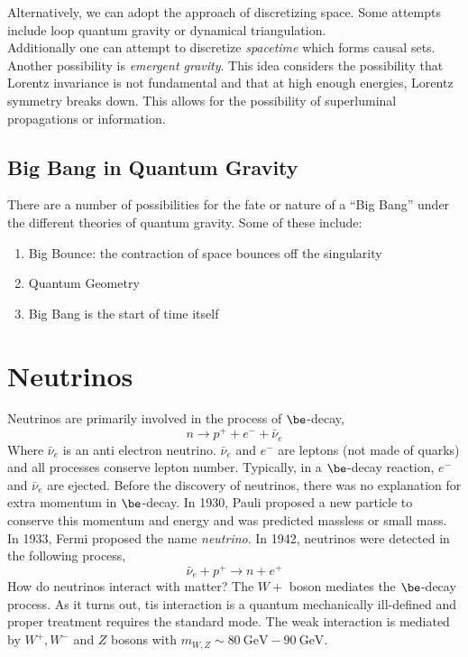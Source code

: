 \documentclass{article}
\begin{document}
Alternatively, we can adopt the approach of discretizing space. Some attempts include loop quantum gravity or dynamical triangulation. \\

Additionally one can attempt to discretize \textit{spacetime} which forms causal sets. \\

Another possibility is \textit{emergent gravity}. This idea considers the possibility that Lorentz invariance is not fundamental and that at high enough energies, Lorentz symmetry breaks down. This allows for the possibility of superluminal propagations or information.

\subsection{Big Bang in Quantum Gravity}

There are a number of possibilities for the fate or nature of a ``Big Bang'' under the different theories of quantum gravity. Some of these include:
\begin{enumerate}
    \item Big Bounce: the contraction of space bounces off the singularity
    \item Quantum Geometry
    \item Big Bang is the start of time itself
\end{enumerate}

\section{Neutrinos}

Neutrinos are primarily involved in the process of $\be$-decay,
\[ n \to p^+ + e^- + \bar \nu_e \]
Where $\bar \nu_e$ is an anti electron neutrino. $\bar \nu_e$ and $e^{-}$ are leptons (not made of quarks) and all processes conserve lepton number. Typically, in a $\be$-decay reaction, $e^{-}$ and $\bar \nu_e$ are ejected. Before the discovery of neutrinos, there was no explanation for extra momentum in $\be$-decay. In 1930, Pauli proposed a new particle to conserve this momentum and energy and was predicted massless or small mass. In 1933, Fermi proposed the name \textit{neutrino}. In 1942, neutrinos were detected in the following process,
\[ \bar \nu_e + p^{+} \to n + e^{+} \]
How do neutrinos interact with matter? The $W+$ boson mediates the $\be$-decay process. As it turns out, tis interaction is a quantum mechanically ill-defined and proper treatment requires the standard mode. The weak interaction is mediated by $W^{+}, W^{-}$ and $Z$ bosons with $m_{W, Z} \sim \SI{80}{\giga \eV} - \SI{90}{\giga \eV}$.\\
\end{document}
